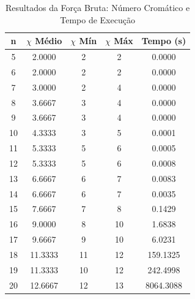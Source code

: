 \begin{table}[H]
\centering
\caption{Resultados da Força Bruta: Número Cromático e Tempo de Execução}
\label{tab:resultados_forca_bruta_2}
\begin{tabular}{ccccc}
\toprule
n & $\chi$ Médio & $\chi$ Mín & $\chi$ Máx & Tempo (s) \\
\midrule
5 & 2.0000 & 2 & 2 & 0.0000 \\
6 & 2.0000 & 2 & 2 & 0.0000 \\
7 & 3.0000 & 2 & 4 & 0.0000 \\
8 & 3.6667 & 3 & 4 & 0.0000 \\
9 & 3.6667 & 3 & 4 & 0.0000 \\
10 & 4.3333 & 3 & 5 & 0.0001 \\
11 & 5.3333 & 5 & 6 & 0.0005 \\
12 & 5.3333 & 5 & 6 & 0.0008 \\
13 & 6.6667 & 6 & 7 & 0.0083 \\
14 & 6.6667 & 6 & 7 & 0.0035 \\
15 & 7.6667 & 7 & 8 & 0.1429 \\
16 & 9.0000 & 8 & 10 & 1.6838 \\
17 & 9.6667 & 9 & 10 & 6.0231 \\
18 & 11.3333 & 11 & 12 & 159.1325 \\
19 & 11.3333 & 10 & 12 & 242.4998 \\
20 & 12.6667 & 12 & 13 & 8064.3088 \\
\bottomrule
\end{tabular}
\end{table}
